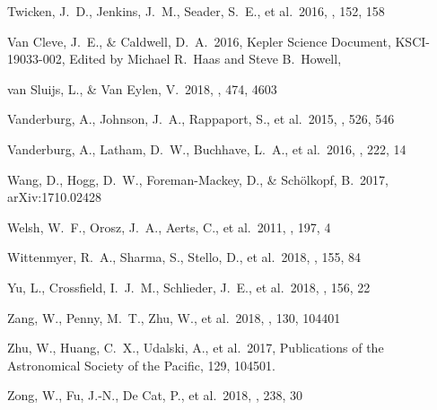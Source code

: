 \documentclass[modern]{aastex62}
\begin{document}
\begin{thebibliography}{}
 Twicken, J.~D., Jenkins, J.~M., Seader, S.~E., et al.\ 2016, \aj, 152, 158 

 Van Cleve, J.~E., \& Caldwell, D.~A.\ 2016, Kepler Science Document, KSCI-19033-002, Edited by Michael R.~Haas and Steve B.~Howell,

 van Sluijs, L., \& Van Eylen, V.\ 2018, \mnras, 474, 4603 

 Vanderburg, A., Johnson, J.~A., Rappaport, S., et al.\ 2015, \nat, 526, 546 

 Vanderburg, A., Latham, D.~W., Buchhave, L.~A., et al.\ 2016, \apjs, 222, 14 

 Wang, D., Hogg, D.~W., Foreman-Mackey, D., \& Sch{\"o}lkopf, B.\ 2017, arXiv:1710.02428 

 Welsh, W.~F., Orosz, J.~A., Aerts, C., et al.\ 2011, \apjs, 197, 4 

 Wittenmyer, R.~A., Sharma, S., Stello, D., et al.\ 2018, \aj, 155, 84 

 Yu, L., Crossfield, I.~J.~M., Schlieder, J.~E., et al.\ 2018, \aj, 156, 22 

 Zang, W., Penny, M.~T., Zhu, W., et al.\ 2018, \pasp, 130, 104401 

 Zhu, W., Huang, C.~X., Udalski, A., et al.\ 2017, Publications of the Astronomical Society of the Pacific, 129, 104501.

 Zong, W., Fu, J.-N., De Cat, P., et al.\ 2018, \apjs, 238, 30 

\end{thebibliography}
\end{document}

